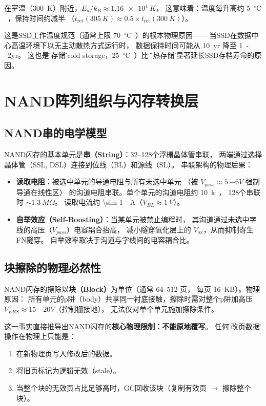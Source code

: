 \documentclass[11pt,a4paper,twoside]{article}
\newcommand{\degC}{\ensuremath{{}^{\circ}\mathrm{C}}}
\theoremstyle{definition}
\theoremstyle{plain}
\theoremstyle{remark}
\begin{document}
在室温（\SI{300}{K}）附近，$E_a/k_B \approx \SI{1.16e4}{K}$，
这意味着：温度每升高约 \SI{5}{\degC{}}，保持时间约减半
（$t_{\text{ret}}(\SI{305}{K}) \approx 0.5 \times t_{\text{ret}}(\SI{300}{K})$）。

这是SSD工作温度规范（通常上限 \SI{70}{\degC{}}）的根本物理原因——
当SSD在数据中心高温环境下以无主动散热方式运行时，
数据保持时间可能从 \SI{10}{yr} 降至 \SI{1}{-2}{yr}。
这也是\"冷存储\"（cold storage，\SI{25}{\degC{}}）比
\"温热存储\"能显著延长SSD存档寿命的原因。

\section{NAND阵列组织与闪存转换层}
\label{sec:array}

\subsection{NAND串的电学模型}

NAND闪存的基本单元是\textbf{串（String）}：32--128个浮栅晶体管串联，
两端通过选择晶体管（SSL, DSL）连接到位线（BL）和源线（SL）。
串联架构的物理后果：

\begin{itemize}
  \item \textbf{读取电阻}：被选中单元的导通电阻与所有未选中单元
  （被 $V_{pass} \approx \SI{5}{-6}{V}$ 强制导通在线性区）
  的沟道电阻串联。单个单元的沟道电阻约 \SI{10}{k\Omega}，
  128个串联时 $\sim \SI{1.3}{M\Omega}$。
  读取电流约 \SI{\sim 1}{\mu A}（$V_{BL} \approx \SI{1}{V}$）。
  \item \textbf{自举效应（Self-Boosting）}：当某单元被禁止编程时，
  其沟道通过未选中字线的高压（$V_{pass}$）电容耦合抬高，
  减小隧穿氧化层上的 $V_{ox}$，从而抑制寄生FN隧穿。
  自举效率取决于沟道与字线间的电容耦合比。
\end{itemize}

\subsection{块擦除的物理必然性}

NAND闪存的擦除以\textbf{块（Block）}为单位（通常 64--512 页，
每页 \SI{16}{KB}）。物理原因：
所有单元的p阱（body）共享同一衬底接触，擦除时需对整个p阱加高压
$V_{ERS} \approx \SI{15}{-20}{V}$（控制栅接地），
无法仅对单个单元施加擦除条件。

这一事实直接推导出NAND闪存的\textbf{核心物理限制：不能原地覆写}。
任何\"修改页数据\"的操作在物理上只能是：
\begin{enumerate}
  \item 在新物理页写入修改后的数据。
  \item 将旧页标记为逻辑无效（stale）。
  \item 当整个块的无效页占比足够高时，GC回收该块（复制有效页 $\to$ 擦除整个块）。
\end{enumerate}
\end{document}
